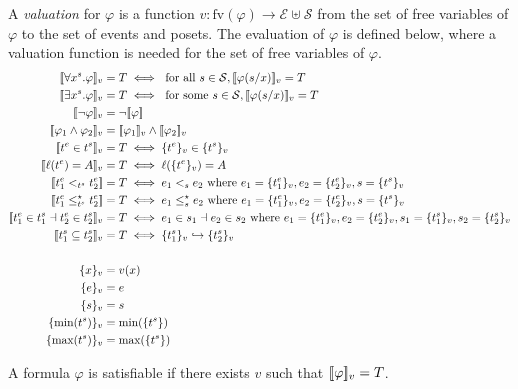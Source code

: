 A \emph{valuation} for $\varphi$ is a function
$v:\text{fv}(\varphi)\to\mathcal{E}\uplus\mathcal{S}$
from the set of free variables of $\varphi$ to the set of events and posets.
%
The evaluation of $\varphi$ is defined below, where a valuation function is needed for the set of free variables of $\varphi$.
\begin{align*}
  \enc{\forall x^s.\varphi}_{v} &= T \iff\text{ for all }s\in\mathcal{S}, \enc{\varphi(s/x)}_{v} = T\\
  \enc{\exists x^s.\varphi}_{v} &= T \iff\text{ for some }s\in\mathcal{S}, \enc{\varphi(s/x)}_{v} = T\\
  \enc{\neg\varphi}_v &= \neg\enc{\varphi} \\
  \enc{\varphi_1\wedge\varphi_2}_v &= \enc{\varphi_1}_v\wedge\enc{\varphi_2}_v\\
  \enc{t^e\in t^s}_v &= T\iff\enct{t^e}_v\in\enct{t^s}_v\\
  \enc{\labl(t^e) = A}_v &= T\iff\labl(\enct{t^e}_v)=A\\
  \enc{t^e_1 <_{t^s} t^e_2} &= T\iff e_1 <_s e_2\text{ where }e_1 = \enct{t^e_1}_v,e_2 = \enct{t^e_2}_v,s = \enct{t^s}_v\\
  \enc{t^e_1 \tleq_{t^s} t^e_2} &= T\iff e_1 \tleq_s e_2\text{ where }e_1 = \enct{t^e_1}_v,e_2 = \enct{t^e_2}_v,s = \enct{t^s}_v\\
  \enc{t^e_1\in t^s_1 \dashv t^e_2\in t^s_2}_v &= T\iff e_1\in s_1 \dashv e_2\in s_2\text{ where }
  e_1 = \enct{t^e_1}_v,e_2 = \enct{t^e_2}_v,s_1 = \enct{t^s_1}_v,s_2 = \enct{t^s_2}_v\\
  \enc{t^s_1\subseteq t^s_2}_v &= T\iff\enct{t^s_1}_v\emb \enct{t^s_2}_v\\
  \\
  \enct{x}_{v} &= v(x)\\
  \enct{e}_{v} &= e\\
  \enct{s}_{v} &= s\\
  \enct{\text{min}(t^s)}_{v} &= \text{min}(\enct{t^s})\\
  \enct{\text{max}(t^s)}_{v} &= \text{max}(\enct{t^s})\\
\end{align*}

A formula $\varphi$ is satisfiable if there exists $v$ such that $[\![\varphi]\!]_v = T$.

